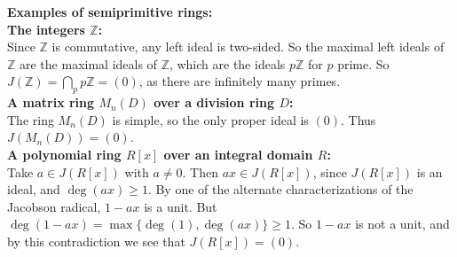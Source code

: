 \documentclass[12pt]{article}
\begin{document}
{\large \bf Examples of semiprimitive rings:}\\

{\bf The integers $\mathbb{Z}$:}\\
Since $\mathbb{Z}$ is commutative, any left ideal is two-sided.  So the maximal left ideals of $\mathbb{Z}$ are the maximal ideals of $\mathbb{Z}$, which are the ideals $p\mathbb{Z}$ for $p$ prime.
So $J(\mathbb{Z})= \bigcap_{p} p\mathbb{Z} = (0)$,
as there are infinitely many primes.\\

{\bf A matrix ring $M_n(D)$ over a division ring $D$:}\\
The ring $M_n(D)$ is simple, so the only proper ideal is $(0)$.  Thus $J(M_n(D))=(0)$.\\

{\bf A polynomial ring $R[x]$ over an integral domain $R$:}\\
Take $a \in J(R[x])$ with $a \neq 0$.
Then $ax \in J(R[x])$, since $J(R[x])$ is an ideal, and $\deg(ax) \geq 1$.
By one of the alternate characterizations of the Jacobson radical,
$1-ax$ is a unit.
But $\deg(1-ax)=\max\{\deg(1), \deg(ax)\} \geq 1$.
So $1-ax$ is not a unit, and by this contradiction we see that $J(R[x])=(0)$.
\end{document}
